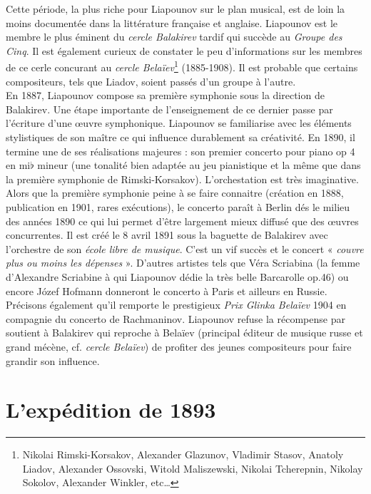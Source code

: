 Cette période, la plus riche pour Liapounov sur le plan musical, est de loin la moins documentée dans la littérature française et anglaise. Liapounov est le membre le plus éminent du \emph{cercle Balakirev} tardif qui succède au \emph{Groupe des Cinq}. Il est également curieux de constater le peu d'informations sur les membres de ce cerle concurant au \emph{cercle Belaïev}\footnote{Nikolai Rimski-Korsakov, Alexander Glazunov, Vladimir Stasov, Anatoly Liadov, Alexander Ossovski, Witold Maliszewski, Nikolai Tcherepnin, Nikolay Sokolov, Alexander Winkler, etc\dots} (1885-1908). Il est probable que certains compositeurs, tels que Liadov, soient passés d'un groupe à l'autre.\\

En 1887, Liapounov compose sa première symphonie sous la direction de Balakirev. Une étape importante de l'enseignement de ce dernier passe par l'écriture d'une œuvre symphonique. Liapounov se familiarise avec les éléments stylistiques de son maître ce qui influence durablement sa créativité. En 1890, il termine une de ses réalisations majeures : son premier concerto pour piano op 4 en mi$\flat$ mineur (une tonalité bien adaptée au jeu pianistique et la même que dans la première symphonie de Rimski-Korsakov). L'orchestation est très imaginative. Alors que la première symphonie peine à se faire connaitre (création en 1888, publication en 1901, rares exécutions), le concerto paraît à Berlin dés le milieu des années 1890 ce qui lui permet d'être largement mieux diffusé que des œuvres concurrentes. Il est créé le 8 avril 1891 sous la baguette de Balakirev avec l'orchestre de son \emph{école libre de musique}. C'est un vif succès et le concert « \emph{couvre plus ou moins les dépenses} ». D'autres artistes tels que Véra Scriabina (la femme d'Alexandre Scriabine à qui Liapounov dédie la très belle Barcarolle op.46) ou encore Józef Hofmann donneront le concerto à Paris et ailleurs en Russie. Précisons également qu'il remporte le prestigieux \emph{Prix Glinka Belaïev} 1904 en compagnie du concerto  de Rachmaninov. Liapounov refuse la récompense par soutient à Balakirev qui reproche à Belaïev (principal éditeur de musique russe et grand mécène, cf. \emph{cercle Belaïev}) de profiter des jeunes compositeurs pour faire grandir son influence.

\section{L'expédition de 1893}


